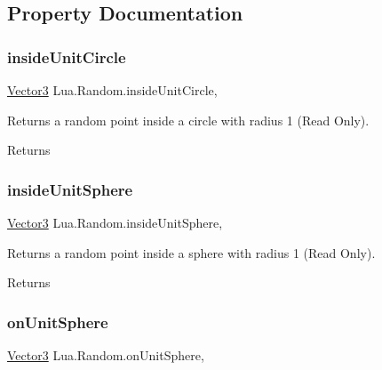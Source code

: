 \subsection{Property Documentation}
\mbox{\label{class_lua_1_1_random_a2e9c7e49b4362f7ab3335f0a46778b70}} 
\subsubsection{\texorpdfstring{insideUnitCircle}{insideUnitCircle}}
{\footnotesize\ttfamily \mbox{\hyperlink{class_lua_1_1_vector3}{Vector3}} Lua.\+Random.\+inside\+Unit\+Circle\hspace{0.3cm}{\ttfamily [static]}, {\ttfamily [get]}}



Returns a random point inside a circle with radius 1 (Read Only). 

\begin{DoxyReturn}{Returns}

\end{DoxyReturn}
\mbox{\label{class_lua_1_1_random_a1c3fa5f6de20e35af1e85564ef928137}} 
\subsubsection{\texorpdfstring{insideUnitSphere}{insideUnitSphere}}
{\footnotesize\ttfamily \mbox{\hyperlink{class_lua_1_1_vector3}{Vector3}} Lua.\+Random.\+inside\+Unit\+Sphere\hspace{0.3cm}{\ttfamily [static]}, {\ttfamily [get]}}



Returns a random point inside a sphere with radius 1 (Read Only). 

\begin{DoxyReturn}{Returns}

\end{DoxyReturn}
\mbox{\label{class_lua_1_1_random_a558a1a73871855fb64ba923ebc7353c4}} 
\subsubsection{\texorpdfstring{onUnitSphere}{onUnitSphere}}
{\footnotesize\ttfamily \mbox{\hyperlink{class_lua_1_1_vector3}{Vector3}} Lua.\+Random.\+on\+Unit\+Sphere\hspace{0.3cm}{\ttfamily [static]}, {\ttfamily [get]}}



